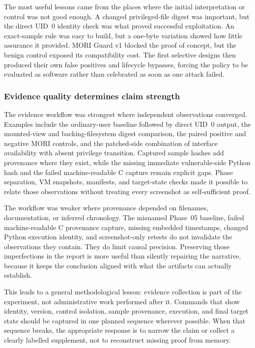 The most useful lessons came from the places where the initial interpretation
or control was not good enough. A changed privileged-file digest was important,
but the direct UID~0 identity check was what proved successful exploitation.
An exact-sample rule was easy to build, but a one-byte variation showed how
little assurance it provided. MORI Guard v1 blocked the proof of concept, but
the benign control exposed its compatibility cost. The first selective designs
then produced their own false positives and lifecycle bypasses, forcing the
policy to be evaluated as software rather than celebrated as soon as one attack
failed.

\subsubsection{Evidence quality determines claim strength}

The evidence workflow was strongest where independent observations converged.
Examples include the ordinary-user baseline followed by direct UID~0 output,
the mounted-view and backing-filesystem digest comparison, the paired positive
and negative MORI controls, and the patched-side combination of interface
availability with absent privilege transition. Captured sample hashes add
provenance where they exist, while the missing immediate vulnerable-side Python
hash and the failed machine-readable C capture remain explicit gaps. Phase
separation, VM snapshots, manifests, and target-state checks made it possible to
relate those observations without treating every screenshot as self-sufficient
proof.

The workflow was weaker where provenance depended on filenames, documentation,
or inferred chronology. The misnamed Phase~05 baseline, failed machine-readable
C provenance capture, missing embedded timestamps, changed Python execution
identity, and screenshot-only retests do not invalidate the observations they
contain. They do limit causal precision. Preserving those imperfections in the
report is more useful than silently repairing the narrative, because it keeps
the conclusion aligned with what the artifacts can actually establish.

This leads to a general methodological lesson: evidence collection is part of
the experiment, not administrative work performed after it. Commands that show
identity, version, control isolation, sample provenance, execution, and final
target state should be captured in one planned sequence wherever possible.
When that sequence breaks, the appropriate response is to narrow the claim or
collect a clearly labelled supplement, not to reconstruct missing proof from
memory.

